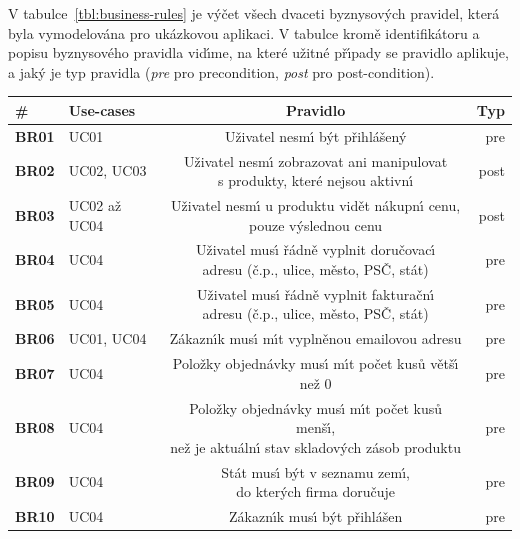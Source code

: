 V tabulce~\ref{tbl:business-rules} je v\'yčet všech dvaceti byznysov\'ych pravidel, která byla
vymodelována pro ukázkovou aplikaci. V tabulce kromě identifikátoru a popisu byznysového pravidla
vid\'{\i}me, na které užitné př\'{\i}pady se pravidlo aplikuje, a jak\'y je typ pravidla
(\textit{pre} pro precondition, \textit{post} pro post-condition).

\begin{table}
    \centering
    \begin{tabular}{ l l c r }
        \hline
        \textbf{\#} & \textbf{Use-cases} & \textbf{Pravidlo} & \textbf{Typ} \\ \hline \hline
        \textbf{BR01} & UC01 & Uživatel nesm\'{\i} b\'yt přihlášen\'y & pre \\ \hline
        \textbf{BR02} & UC02, UC03 & \makecell[c]{Uživatel nesm\'{\i} zobrazovat ani manipulovat \\ s produkty, které nejsou aktivn\'{\i}} & post \\ \hline
        \textbf{BR03} & UC02 až UC04 & \makecell[c]{Uživatel nesm\'{\i} u produktu vidět nákupn\'{\i} cenu, \\ pouze v\'yslednou cenu} & post \\ \hline
        \textbf{BR04} & UC04 & \makecell[c]{Uživatel mus\'{\i} řádně vyplnit doručovac\'{\i} \\ adresu (č.p., ulice, město, PSČ, stát)} & pre \\ \hline
        \textbf{BR05} & UC04 & \makecell[c]{Uživatel mus\'{\i} řádně vyplnit fakturačn\'{\i} \\ adresu (č.p., ulice, město, PSČ, stát)} & pre \\ \hline
        \textbf{BR06} & UC01, UC04 & Zákazn\'{\i}k mus\'{\i} m\'{\i}t vyplněnou emailovou adresu & pre \\ \hline
        \textbf{BR07} & UC04 & Položky objednávky mus\'{\i} m\'{\i}t počet kusů větš\'{\i} než 0 & pre \\ \hline
        \textbf{BR08} & UC04 & \makecell[c]{Položky objednávky mus\'{\i} m\'{\i}t počet kusů menš\'{\i}, \\ než je aktuáln\'{\i} stav skladov\'ych zásob produktu} & pre \\ \hline
        \textbf{BR09} & UC04 & \makecell[c]{Stát mus\'{\i} b\'yt v seznamu zem\'{\i}, \\ do kter\'ych firma doručuje} & pre \\ \hline
        \textbf{BR10} & UC04 & Zákazn\'{\i}k mus\'{\i} b\'yt přihlášen & pre \\ \hline

\end{tabular}
\end{table}
